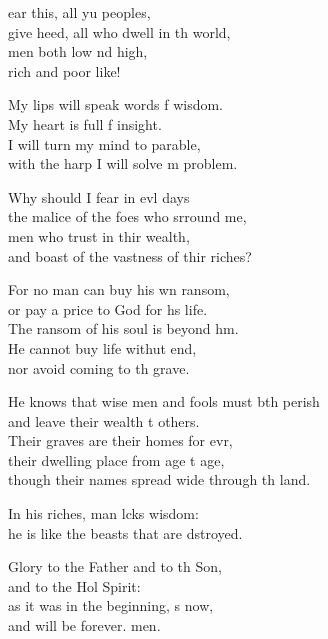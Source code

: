 \settowidth{\versewidth}{He knows that wise men and fools must both perish *}
\begin{psalmverse}%
  \begin{patverse}
ear this, all yu peoples,\Med\\
give heed, all who dwell in th world,\\
men both low nd high,\Med\\
rich and poor like!

My lips will speak words f wisdom.\Med\\
My heart is full f insight.\\
I will turn my mind to  parable,\Med\\
with the harp I will solve m problem.

Why should I fear in ev\pointup{\i}l days\Med\\
the malice of the foes who srround me,\\
men who trust in thir wealth,\Med\\
and boast of the vastness of thir riches?

For no man can buy his wn ransom,\Med\\
or pay a price to God for h\pointup{\i}s life.\\
The ransom of his soul is beyond h\pointup{\i}m.\Flex\\
He cannot buy life withut end,\Med\\
nor avoid coming to th grave.

He knows that wise men and fools must bth perish\Med\\
and leave their wealth t others.\\
Their graves are their homes for evr,\Flex\\
their dwelling place from age t age,\Med\\
though their names spread wide through th land.

In his riches, man lcks wisdom:\Med\\
he is like the beasts that are dstroyed.

Glory to the Father and to th Son,\Med\\
and to the Hol Spirit:\\
as it was in the beginning, \pointup{\i}s now,\Med\\
and will be forever. men. 
  \end{patverse}
\end{psalmverse}

